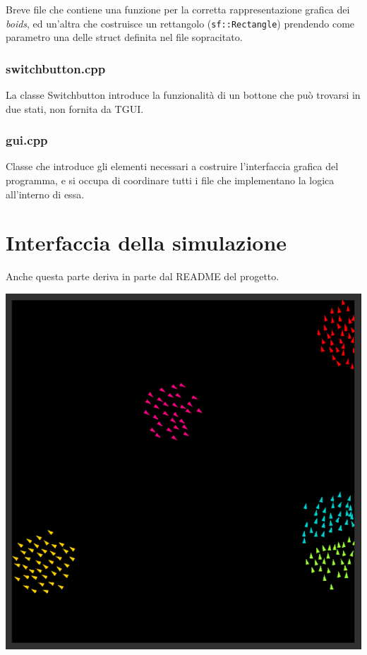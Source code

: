 \documentclass[10pt,a4paper]{article}
\begin{document}
Breve file che contiene una funzione per la corretta rappresentazione grafica dei \textit{boids}, ed un'altra che costruisce un rettangolo (\texttt{sf::Rectangle}) prendendo come parametro una delle struct definita nel file sopracitato.

\subsubsection{switchbutton.cpp}

La classe Switchbutton introduce la funzionalità di un bottone che può trovarsi in due stati, non fornita da TGUI.

\subsubsection{gui.cpp}

Classe che introduce gli elementi necessari a costruire l'interfaccia grafica del programma, e si occupa di coordinare tutti i file che implementano la logica all'interno di essa. 

\newpage

\section{Interfaccia della simulazione}

Anche questa parte deriva in parte dal README del progetto.

\begin{center}
    \includegraphics[width=1.0\textwidth]{../images/interface.png}
\end{center}
\end{document}
